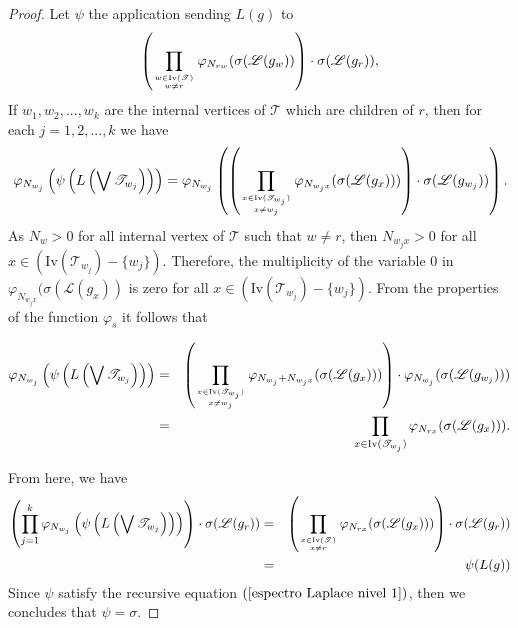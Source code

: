 \documentclass[11pt]{article}
\theoremstyle{definition}
\begin{document}
\begin{proof}
Let $\psi$ the application sending $L(g)$ to \[\left(\prod_{w\in \mathrm{Iv}(\mathscr{T})\atop w\neq r} \varphi_{N_{rw}}(\sigma(\mathscr{L}(g_w))\right)\cdot \sigma(\mathscr{L}(g_r)),\]
If $w_1, w_2,..., w_k$ are the internal vertices of $\mathscr{T}$ which are children of $r$, then for each $j=1,2,...,k$ we have
\[\varphi_{N_{w_j}}\left(\psi \left(L\left(\bigvee \mathscr{T}_{w_j}\right)\right)\right)=\varphi_{N_{w_j}}\left(\left(\prod_{x\in \mathrm{Iv}(\mathscr{T}_{w_j})\atop x\neq w_j} \varphi_{N_{w_jx}}(\sigma(\mathscr{L}(g_x)))\right)\cdot \sigma(\mathscr{L}(g_{w_j}))\right).\]
As $N_w>0$ for all internal vertex of $\mathscr{T}$ such that $w\neq r$, then $N_{w_jx}>0$ for all $x\in (\mathrm{Iv}(\mathscr{T}_{w_j})-\{w_j\})$. Therefore, the multiplicity of the variable $0$ in $\varphi_{N_{w_jx}}(\sigma(\mathscr{L}(g_x))$ is zero for all $x\in (\mathrm{Iv}(\mathscr{T}_{w_j})-\{w_j\})$. From the properties of the function $\varphi_s$ it follows that

\begin{eqnarray*}\varphi_{N_{w_j}}\left(\psi \left(L\left(\bigvee \mathscr{T}_{w_j}\right)\right)\right)&=&\left(\prod_{x\in \mathrm{Iv}(\mathscr{T}_{w_j})\atop x\neq w_j} \varphi_{N_{w_j}+N_{w_jx}}(\sigma(\mathscr{L}(g_x)))\right)\cdot \varphi_{N_{w_j}}(\sigma(\mathscr{L}(g_{w_j})))\\
&=&\prod_{x\in \mathrm{Iv}(\mathscr{T}_{w_j})} \varphi_{N_{rx}}(\sigma(\mathscr{L}(g_x))).
\end{eqnarray*}

From here, we have
\begin{eqnarray*}
\left(\prod^k_{j=1}\varphi_{N_{w_j}}\left(\psi \left(L\left(\bigvee \mathscr{T}_{w_j}\right)\right)\right) \right)\cdot \sigma(\mathscr{L}(g_r))&=& \left(\prod_{x\in \mathrm{Iv}(\mathscr{T})\atop x\neq r} \varphi_{N_{rx}}(\sigma(\mathscr{L}(g_x)))\right)\cdot \sigma(\mathscr{L}(g_r))\\
&=&\psi(L(g))
\end{eqnarray*}
Since $\psi$ satisfy the recursive equation $(\ref{espectro Laplace nivel 1})$, then we concludes that $\psi=\sigma$.
\end{proof}
\end{document}
